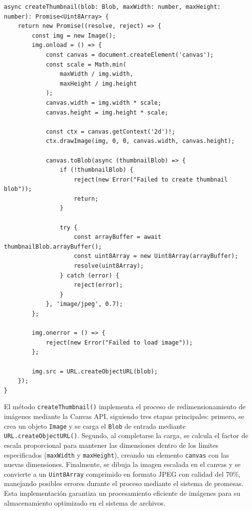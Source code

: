 \documentclass[11pt, a4paper]{article}
\begin{document}
                \begin{lstlisting}[caption={createThumbnail()}]
async createThumbnail(blob: Blob, maxWidth: number, maxHeight: number): Promise<Uint8Array> {
    return new Promise((resolve, reject) => {
        const img = new Image();
        img.onload = () => {
            const canvas = document.createElement('canvas');
            const scale = Math.min(
                maxWidth / img.width,
                maxHeight / img.height
            );
            canvas.width = img.width * scale;
            canvas.height = img.height * scale;
            
            const ctx = canvas.getContext('2d')!;
            ctx.drawImage(img, 0, 0, canvas.width, canvas.height);
            
            canvas.toBlob(async (thumbnailBlob) => {
                if (!thumbnailBlob) {
                    reject(new Error("Failed to create thumbnail blob"));
                    return;
                }
                
                try {
                    const arrayBuffer = await thumbnailBlob.arrayBuffer();
                    const uint8Array = new Uint8Array(arrayBuffer);
                    resolve(uint8Array);
                } catch (error) {
                    reject(error);
                }
            }, 'image/jpeg', 0.7);
        };
        
        img.onerror = () => {
            reject(new Error("Failed to load image"));
        };
        
        img.src = URL.createObjectURL(blob);
    });
}
                \end{lstlisting}

                El método \verb|createThumbnail()| implementa el proceso de redimensionamiento de imágenes mediante la Canvas API, siguiendo tres etapas principales: primero, se crea un objeto \verb|Image| y se carga el \verb|Blob| de entrada mediante \verb|URL.createObjectURL()|. Segundo, al completarse la carga, se calcula el factor de escala proporcional para mantener las dimensiones dentro de los límites especificados (\verb|maxWidth| y \verb|maxHeight|), creando un elemento \verb|canvas| con las nuevas dimensiones. Finalmente, se dibuja la imagen escalada en el canvas y se convierte a un \verb|Uint8Array| comprimido en formato JPEG con calidad del 70\%, manejando posibles errores durante el proceso mediante el sistema de promesas. Esta implementación garantiza un procesamiento eficiente de imágenes para su almacenamiento optimizado en el sistema de archivos. \\
\end{document}
